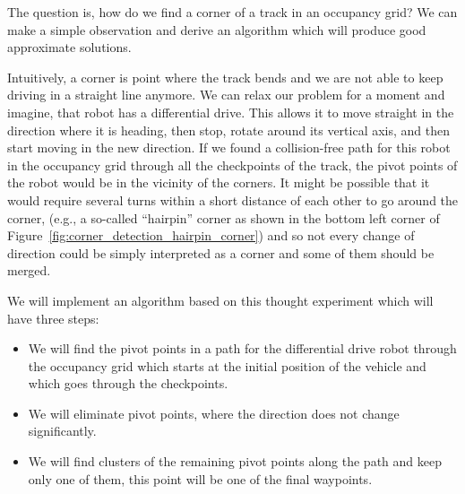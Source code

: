 The question is, how do we find a corner of a track in an occupancy grid? We can make a simple observation and derive an algorithm which will produce good approximate solutions.

Intuitively, a corner is point where the track bends and we are not able to keep driving in a straight line anymore. We can relax our problem for a moment and imagine, that robot has a differential drive. This allows it to move straight in the direction where it is heading, then stop, rotate around its vertical axis, and then start moving in the new direction. If we found a collision-free path for this robot in the occupancy grid through all the checkpoints of the track, the pivot points of the robot would be in the vicinity of the corners. It might be possible that it would require several turns within a short distance of each other to go around the corner, (e.g., a so-called ``hairpin'' corner as shown in the bottom left corner of Figure~\ref{fig:corner_detection_hairpin_corner}) and so not every change of direction could be simply interpreted as a corner and some of them should be merged.

We will implement an algorithm based on this thought experiment which will have three steps:
\begin{itemize}
	\item We will find the pivot points in a path for the differential drive robot through the occupancy grid which starts at the initial position of the vehicle and which goes through the checkpoints.
	\item We will eliminate pivot points, where the direction does not change significantly.
	\item We will find clusters of the remaining pivot points along the path and keep only one of them, this point will be one of the final waypoints.
\end{itemize}

